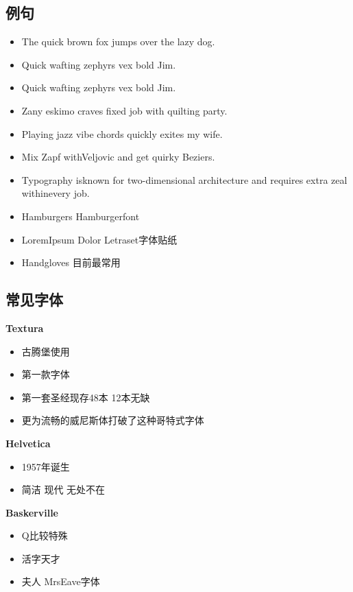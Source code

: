 \documentclass[
  letterpaper,
  DIV=11,
  numbers=noendperiod]{scrreprt}
\providecommand{\tightlist}{%
  \setlength{\itemsep}{0pt}\setlength{\parskip}{0pt}}\usepackage{longtable,booktabs,array}
\begin{document}
\subsection{例句}\label{ux4f8bux53e5}

\begin{itemize}
\tightlist
\item
  The quick brown fox jumps over the lazy dog.
\item
  Quick wafting zephyrs vex bold Jim.
\item
  Quick wafting zephyrs vex bold Jim.
\item
  Zany eskimo craves fixed job with quilting party.
\item
  Playing jazz vibe chords quickly exites my wife.
\item
  Mix Zapf withVeljovic and get quirky Beziers.
\item
  Typography isknown for two-dimensional architecture and requires extra
  zeal withinevery job.
\item
  Hamburgers \textbar{} Hamburgerfont
\item
  LoremIpsum Dolor Letraset字体贴纸
\item
  Handgloves 目前最常用
\end{itemize}

\subsection{常见字体}\label{ux5e38ux89c1ux5b57ux4f53}

\textbf{Textura}

\begin{itemize}
\tightlist
\item
  古腾堡使用
\item
  第一款字体
\item
  第一套圣经现存48本 12本无缺
\item
  更为流畅的威尼斯体打破了这种哥特式字体
\end{itemize}

\textbf{Helvetica}

\begin{itemize}
\tightlist
\item
  1957年诞生
\item
  简洁 现代 无处不在
\end{itemize}

\textbf{Baskerville}

\begin{itemize}
\tightlist
\item
  Q比较特殊
\item
  活字天才
\item
  夫人 MrsEave字体
\end{itemize}
\end{document}
